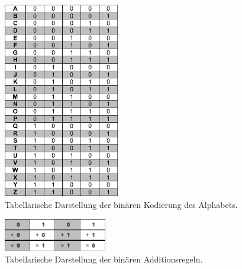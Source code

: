 \begin{figure}[H]
	\centering
	\includegraphics[width=0.45\textwidth]{content/tabelle/alphabet.pdf}
	\caption{Tabellarische Darstellung der binären Kodierung des Alphabets. \cite{krypt}}
\end{figure}

\begin{figure}[H]
	\centering
	\includegraphics[width=0.4\textwidth]{content/tabelle/addition.pdf}
	\caption{Tabellarische Darstellung der binären Additionsregeln. \cite{krypt}}
\end{figure}
